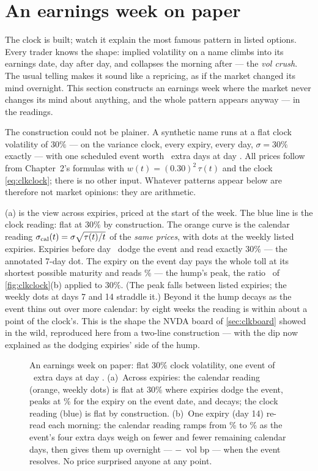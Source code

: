\section{An earnings week on paper}
\label{sec:clkcrush}

The clock is built; watch it explain the most famous pattern in
listed options.  Every trader knows the shape: implied volatility on
a name climbs into its earnings date, day after day, and collapses
the morning after --- the \emph{vol crush}.  The usual telling makes
it sound like a repricing, as if the market changed its mind
overnight.  This section constructs an earnings week where the market
never changes its mind about anything, and the whole pattern appears
anyway --- in the readings.

The construction could not be plainer.  A synthetic name runs at a
flat clock volatility of $30\%$ --- on the variance clock, every
expiry, every day, $\sigma=30\%$ exactly --- with one scheduled event
worth \MacClkClockExtraDays\ extra days at day \MacClkClockEventDay.
All prices follow from Chapter~2's formulas with
$w(t)=(0.30)^2\,\tau(t)$ and the clock \eqref{eq:clkclock}; there is
no other input.  Whatever patterns appear below are therefore not
market opinions: they are arithmetic.

(a) is the view across expiries, priced at the
start of the week.  The blue line is the clock reading: flat at
$30\%$ by construction.  The orange curve is the calendar reading
$\sigma_{\rm cal}(t)=\sigma\sqrt{\tau(t)/t}$ of the \emph{same
prices}, with dots at the weekly listed expiries.  Expiries before
day \MacClkClockEventDay\ dodge the event and read exactly $30\%$ ---
the annotated 7-day dot.  The expiry on the event day pays the whole
toll at its shortest possible maturity and reads
\MacClkCrushTermPeakPct\% --- the hump's peak, the ratio
\MacClkClockPeakRatio\ of \cref{fig:clkclock}(b) applied to $30\%$.
(The peak falls between listed expiries; the weekly dots at days 7
and 14 straddle it.)  Beyond it the hump decays as the event thins
out over more calendar: by eight weeks the reading is within about a
point of the clock's.  This
is the shape the NVDA board of \cref{sec:clkboard} showed in the
wild, reproduced here from a two-line construction --- with the dip
now explained as the dodging expiries' side of the hump.

\begin{figure}[htbp]
\centering
{}
\caption{An earnings week on paper: flat $30\%$ clock volatility, one
event of \MacClkClockExtraDays\ extra days at day
\MacClkClockEventDay.  (a)~Across expiries: the calendar reading
(orange, weekly dots) is flat at $30\%$ where expiries dodge the
event, peaks at \MacClkCrushTermPeakPct\% for the expiry on the event
date, and decays; the clock reading (blue) is flat by construction.
(b)~One expiry (day 14) re-read each morning: the calendar reading
ramps from \MacClkCrushRampStartPct\% to \MacClkCrushPeakPct\% as the
event's four extra days weigh on fewer and fewer remaining calendar
days, then gives them up overnight --- $-$\MacClkCrushDropBp\ vol bp
--- when the event resolves.  No price surprised anyone at any
point.}
\label{fig:clkcrush}
\end{figure}

